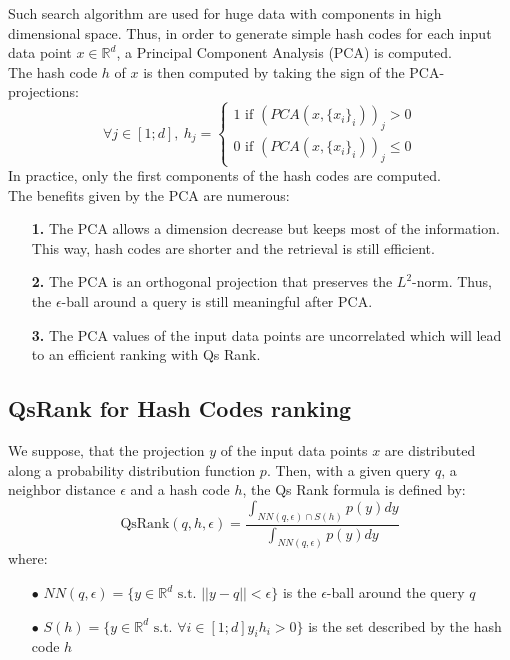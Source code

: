 \documentclass{article}
\newcommand{\RR}{\mathbb{R}}
\newcommand{\qr}{\textrm{QsRank}}
\begin{document}
Such search algorithm are used for huge data with components in high dimensional space. Thus, in order to generate simple hash codes for each input data point $x \in \RR^d$, a Principal Component Analysis (PCA) is computed.\\
The hash code $h$ of $x$ is then computed by taking the sign of the PCA-projections:
\[	
\forall j \in [1;d],\ h_j = 	
 	\left \{
		\begin{array}{c}
    		1 \text{ if }(PCA(x, \{x_i\}_i))_j > 0 \\
    		0 \text{ if }(PCA(x, \{x_i\}_i))_j \leq 0
		\end{array}
	\right.
\]
In practice, only the first components of the hash codes are computed.\\
The benefits given by the PCA are numerous:
\begin{itemize}
	\item[\textbf{1.}] The PCA allows a dimension decrease but keeps most of the information. This way, hash codes are shorter and the retrieval is still efficient.
	\item[\textbf{2.}] The PCA is an orthogonal projection that preserves the $L^2$-norm. Thus, the $\epsilon$-ball around a query is still meaningful after PCA.
	\item[\textbf{3.}] The PCA values of the input data points are uncorrelated which will lead to an efficient ranking with Qs Rank.
\end{itemize}

\subsection{QsRank for Hash Codes ranking}

We suppose, that the projection $y$ of the input data points $x$ are distributed along a probability distribution function $p$. Then, with a given query $q$, a neighbor distance $\epsilon$ and a hash code $h$, the Qs Rank formula is defined by:
\[
	\qr(q, h, \epsilon) = \frac{\int_{NN(q,\epsilon) \cap S(h)} p(y) dy}{\int_{NN(q,\epsilon)} p(y) dy}
\]
where:
\begin{enumerate}
	\item[$\bullet$]$NN(q,\epsilon) = \{y \in \RR^d \text{ s.t. } ||y-q||<\epsilon\}$ is the $\epsilon$-ball around the query $q$
	\item[$\bullet$]$S(h) = \{y \in \RR^d \text{ s.t. } \forall i \in [1;d] y_i h_i > 0 \}$ is the set described by the hash code $h$
\end{enumerate}
\end{document}
